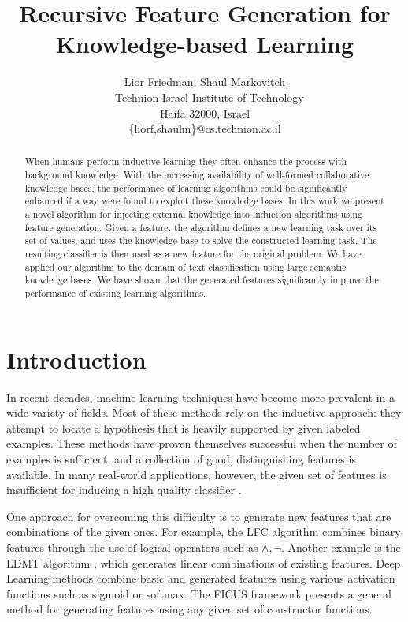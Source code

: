\documentclass{article}
\title{Recursive Feature Generation for Knowledge-based Learning}
\author{\name Lior Friedman, \name Shaul Markovitch\\\
	Technion-Israel Institute of Technology\\
	Haifa 32000, Israel\\
	\{liorf,shaulm\}@cs.technion.ac.il}
\theoremstyle{definition}
\begin{document}

\maketitle

\begin{abstract}
	When humans perform inductive learning they often enhance the process with background knowledge.
	With the increasing availability of well-formed collaborative knowledge bases, the performance of learning algorithms could
	be significantly enhanced if a way were found to exploit these knowledge bases. 
	In this work we present a novel algorithm for injecting external knowledge into induction algorithms using feature generation. Given a feature, the algorithm defines a new learning task over its set of values, and uses the knowledge base to solve the constructed learning task. The resulting classifier is then used as a new feature for the original problem.
	We have applied our algorithm to the domain of text classification using large semantic knowledge bases. We have shown that the generated features significantly improve the performance of existing learning algorithms.
\end{abstract}

\section{Introduction}
\label{sec:Intro}
In recent decades, machine learning techniques have become more prevalent in a wide variety of fields. %
Most of these methods rely on the inductive approach: they attempt to locate a hypothesis that is heavily supported by given labeled examples. These methods have proven themselves successful when the number of examples is sufficient, and a collection of good,
distinguishing features is available.
In many real-world applications, however, the given set of features is insufficient for inducing a high quality classifier \citep{levi2004learning,paulheim2012unsupervisedfull}.

One approach for overcoming this difficulty is to generate new features that are combinations of the given ones.
For example, the LFC algorithm \citep{ragavan1993complex} combines binary features through the use of logical operators such as $\land ,\lnot$.
Another example is the LDMT algorithm \citep{utgo1991linear}, which generates linear combinations of existing features.
Deep Learning methods combine basic and generated features using various activation functions such as sigmoid or softmax.
The FICUS framework \citep{markovitch2002feature} presents a general method for generating features using any given set of constructor functions.
\end{document}
